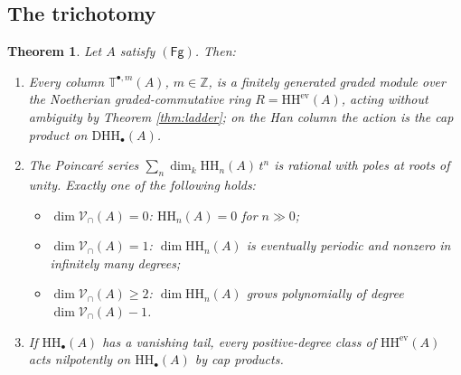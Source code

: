 \documentclass[11pt]{amsart}
\newtheorem{theorem}{Theorem}[section]
\theoremstyle{definition}
\newcommand{\T}{\mathbb{T}}
\newcommand{\HH}{\mathrm{HH}}
\newcommand{\D}{\mathrm{D}}
\newcommand{\Vcap}{\mathcal{V}_{\cap}}
\newcommand{\kk}{k}
\newcommand{\Fg}{\mathsf{(Fg)}}
\begin{document}
\subsection{The trichotomy}

\begin{theorem}\label{thm:fg}
Let $A$ satisfy $\Fg$. Then:
\begin{enumerate}
\item Every column $\T^{\bullet,m}(A)$, $m\in\mathbb Z$, is a finitely
generated graded module over the Noetherian graded-commutative ring
$R=\HH^{\mathrm{ev}}(A)$, acting without ambiguity by Theorem
\ref{thm:ladder}; on the Han column the action is the cap product on
$\D\HH_\bullet(A)$.
\item The Poincar\'e series $\sum_n\dim_\kk\HH_n(A)\,t^n$ is rational with
poles at roots of unity. Exactly one of the following holds:
\begin{itemize}
\item[(a)] $\dim\Vcap(A)=0$: $\HH_n(A)=0$ for $n\gg0$;
\item[(b)] $\dim\Vcap(A)=1$: $\dim\HH_n(A)$ is eventually periodic and
nonzero in infinitely many degrees;
\item[(c)] $\dim\Vcap(A)\ge2$: $\dim\HH_n(A)$ grows polynomially of degree
$\dim\Vcap(A)-1$.
\end{itemize}
\item If $\HH_\bullet(A)$ has a vanishing tail, every positive-degree class
of $\HH^{\mathrm{ev}}(A)$ acts nilpotently on $\HH_\bullet(A)$ by cap
products.
\end{enumerate}
\end{theorem}
\end{document}
